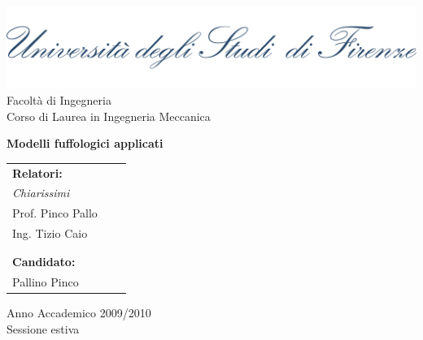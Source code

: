 \begin{titlepage}
\begin{center}
\includegraphics[scale=0.10]{logo/logotipounifi}\\
\vspace{6mm}
{\large{{Facoltà di Ingegneria\\
Corso di Laurea in Ingegneria Meccanica}}}
\end{center}
\vspace{15mm}
\begin{center}
{\LARGE{\bf Modelli fuffologici applicati}}\\
\end{center}
\vspace{23mm}
\begin{tabular}{lcr}
\textbf{Relatori:} & \\
\textit{Chiarissimi} & \\
Prof. Pinco Pallo & \dotfill\\
Ing. Tizio Caio & \dotfill \\
&\hspace{65mm} \\
&\\
\textbf{Candidato:} & \\
Pallino Pinco & \dotfill\\
\end{tabular}
\vspace{15mm}
\begin{center}
{\large{Anno Accademico 2009/2010\\
Sessione estiva}}
\end{center}
\end{titlepage} 